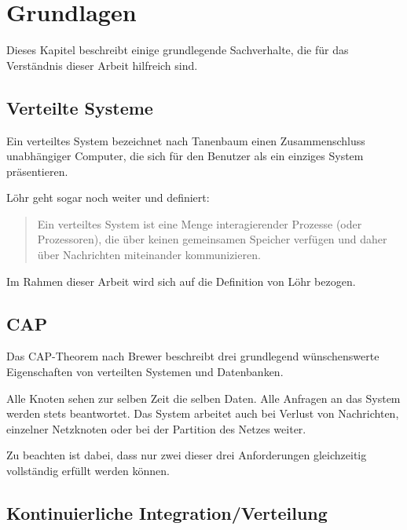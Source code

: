 \chapter{Grundlagen}
\label{chap:base}
Dieses Kapitel beschreibt einige grundlegende Sachverhalte,
die für das Verständnis dieser Arbeit hilfreich sind.

\section{Verteilte Systeme}
\label{sec:base:vs}

Ein verteiltes System bezeichnet nach Tanenbaum \cite{tanenbaum:vs}
einen Zusammenschluss unabhängiger Computer, die sich für den Benutzer als ein einziges System präsentieren.

L\"ohr geht sogar noch weiter und definiert:
\begin{quotation}
    Ein verteiltes System ist eine Menge
    interagierender Prozesse (oder Prozessoren),
    die über keinen gemeinsamen Speicher verfügen
    und daher über Nachrichten miteinander kommunizieren. \cite{loehr:vs}
\end{quotation}

Im Rahmen dieser Arbeit wird sich auf die Definition von L\"ohr bezogen.

\section{CAP}
\label{sec:base:cap}
Das \ac{CAP}-Theorem nach Brewer \cite{brewer:cap} beschreibt drei grundlegend
wünschenswerte Eigenschaften von verteilten Systemen und Datenbanken.

\begin{itemize}
  \dhitem[Konsistenz (C)]
      Alle Knoten sehen zur selben Zeit die selben Daten. 
  \dhitem[Verfügbarkeit (A)]
      Alle Anfragen an das System werden stets beantwortet.
  \dhitem[Partitionstoleranz (P)]
      Das System arbeitet auch bei Verlust von Nachrichten,
      einzelner Netzknoten oder bei der Partition des Netzes weiter.
\end{itemize}

Zu beachten ist dabei, dass nur zwei dieser drei Anforderungen gleichzeitig
vollständig erfüllt werden können.

\section{Kontinuierliche Integration/Verteilung}
\label{sec:base:ci}

